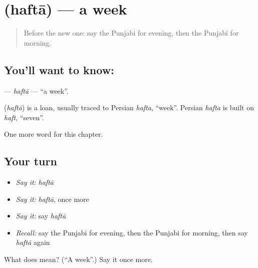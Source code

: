 \section[\texorpdfstring{\pa{ਹਫ਼ਤਾ} (haftā)}{ਹਫ਼ਤਾ (haftā)}]{ (haftā) — a week}

\label{lesson:PA-C85-hafta}



\begin{quote}
Before the new one: say the Punjabi for evening, then the Punjabi for morning.
\end{quote}

\subsection*{You'll want to know: }
\textbf{} — \emph{haftā} — \textquotedblleft{}a week\textquotedblright{}.

\begin{cousinweb}
\textbf{} (\emph{haftā}) is a loan, usually traced to Persian \emph{hafta}, \textquotedblleft{}week\textquotedblright{}. Persian \emph{hafta} is built on \emph{haft}, \textquotedblleft{}seven\textquotedblright{}.
\end{cousinweb}

\begin{grammarlens}[title={What you've built}]
One more word for this chapter.
\end{grammarlens}

\subsection*{Your turn}
\begin{itemize}
\raggedright
  \item \emph{Say it:} \emph{haftā}
  \item \emph{Say it:} \emph{haftā}, once more
  \item \emph{Say it:} say \emph{haftā}
  \item \emph{Recall:} say the Punjabi for evening, then the Punjabi for morning, then say \emph{haftā} again
\end{itemize}

\begin{tcolorbox}[breakable,colback=teal!4,colframe=teal!35!black,title={Before you move on}]
What does  mean? (\textquotedblleft{}A week\textquotedblright{}.) Say it once more.
\end{tcolorbox}
